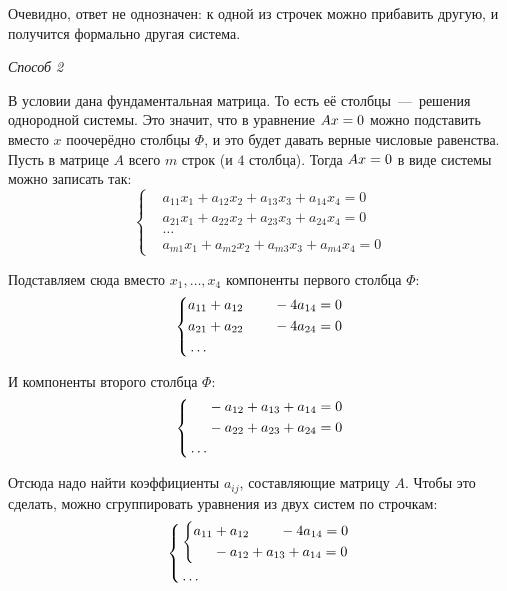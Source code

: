 \documentclass[a4paper,12pt]{article}
\begin{document}
\begin{solution}
    Очевидно, ответ не однозначен: к одной из строчек можно прибавить другую, и получится формально другая система.
    
    \bigskip
    
    \emph{Способ 2}
    
    В условии дана фундаментальная матрица.
    То есть её столбцы~---~решения однородной системы.
    Это значит, что в уравнение $Ax \hm= 0$ можно подставить вместо $x$ поочерёдно столбцы $\Phi$, и это будет давать верные числовые равенства.
    Пусть в матрице $A$ всего $m$ строк (и $4$ столбца).
    Тогда $Ax \hm= 0$ в виде системы можно записать так:
    \[
      \left\{
        \begin{aligned}
          &a_{11} x_1 + a_{12} x_2 + a_{13} x_3 + a_{14} x_4 = 0\\
          &a_{21} x_1 + a_{22} x_2 + a_{23} x_3 + a_{24} x_4 = 0\\
          &\ldots\\
          &a_{m1} x_1 + a_{m2} x_2 + a_{m3} x_3 + a_{m4} x_4 = 0
        \end{aligned}
      \right.
    \]
    
    Подставляем сюда вместо $x_1, \ldots, x_4$ компоненты первого столбца $\Phi$:
    \[
      \left\{
        \begin{aligned}
          &a_{11} + a_{12} \hphantom{+ a_{13}} - 4 a_{14} = 0\\
          &a_{21} + a_{22} \hphantom{+ a_{23}} - 4 a_{24} = 0\\
          &\ldots
        \end{aligned}
      \right.
    \]
    
    И компоненты второго столбца $\Phi$:
    \[
      \left\{
        \begin{aligned}
          &\hphantom{a_{11}} - a_{12} + a_{13} + a_{14} = 0\\
          &\hphantom{a_{21}} - a_{22} + a_{23} + a_{24} = 0\\
          &\ldots
        \end{aligned}
      \right.
    \]
    
    Отсюда надо найти коэффициенты $a_{ij}$, составляющие матрицу $A$.
    Чтобы это сделать, можно сгруппировать уравнения из двух систем по строчкам:
    \[
      \left\{
        \begin{aligned}
          &\left\{
            \begin{aligned}
              &a_{11} + a_{12} \hphantom{+ a_{13}} - 4 a_{14} = 0\\
              &\hphantom{a_{11}} - a_{12} + a_{13} + a_{14} = 0\\
            \end{aligned}
          \right.\\
          &\ldots
        \end{aligned}
      \right.
    \]
    

\end{solution}
\end{document}

